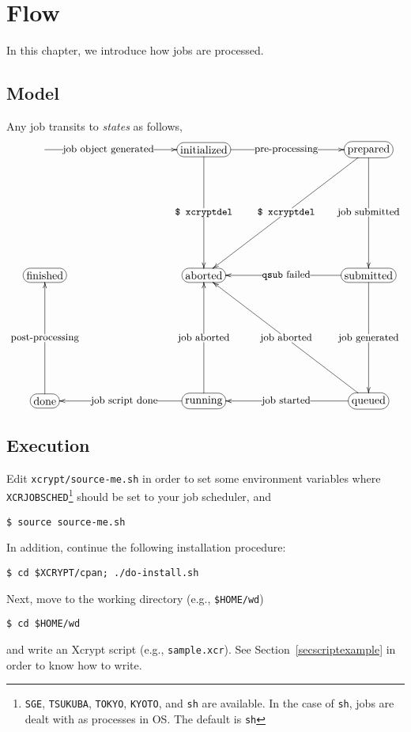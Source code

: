 \documentclass[a4paper,10pt]{report}
\begin{document}
\chapter{Flow}

In this chapter, we introduce how jobs are processed.

\section{Model}\label{sec:states}

Any job transits to \textit{states} as follows,
\[
\entrymodifiers={+[F-:<10pt>]}
\xymatrix@=100pt{
  *{} \ar[r]|(.4){\txt{\small job object generated}} &
  \txt{initialized} \ar[r]|{\txt{\small pre-processing}} \ar[d]|{\txt{\small \texttt{\$ xcryptdel}}}&
  \txt{prepared} \ar[d]|{\txt{\small job submitted}} \ar[ld]|{\txt{\small \texttt{\$ xcryptdel}}}\\
  \txt{finished} &
  \txt{aborted} &
  \txt{submitted} \ar[d]|{\txt{\small job generated}} \ar[l]|{\txt{\small \texttt{qsub} failed}}\\
  \txt{done} \ar[u]|{\txt{\small post-processing}} &
  \txt{running} \ar[l]|{\txt{\small job script done}} \ar[u]|{\txt{\small job aborted}} &
  \txt{queued} \ar[l]|{\txt{\small job started}} \ar[lu]|{\txt{\small job aborted}}
}
\]

\section{Execution}

Edit \texttt{xcrypt/source-me.sh} in order to set some environment
variables where \texttt{XCRJOBSCHED}\footnote{\texttt{SGE},
\texttt{TSUKUBA}, \texttt{TOKYO}, \texttt{KYOTO}, and \texttt{sh} are
available.  In the case of \texttt{sh}, jobs are dealt with as
processes in OS.  The default is \texttt{sh}} should be set to your
job scheduler, and
\begin{screen}
\texttt{\$ source source-me.sh}
\end{screen}
In addition, continue the following installation procedure:
\begin{screen}
\texttt{\$ cd \$XCRYPT/cpan; ./do-install.sh}
\end{screen}

Next, move to the working directory (e.g., \texttt{\$HOME/wd})
\begin{screen}
\texttt{\$ cd \$HOME/wd}
\end{screen}
and write an Xcrypt script (e.g., \texttt{sample.xcr}).  See
Section~\ref{secscriptexample} in order to know how to write.
\end{document}

